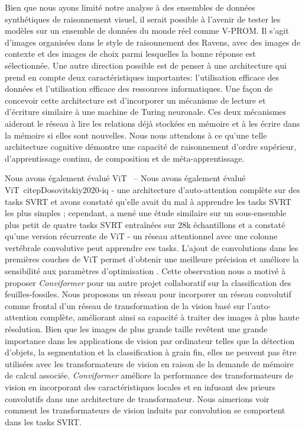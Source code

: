 Bien que nous ayons limit\'e notre analyse \`a des ensembles de donn\'ees synth\'etiques de raisonnement visuel, il serait possible \`a l'avenir de tester les mod\`eles sur un ensemble de donn\'ees du monde r\'eel comme V-PROM. Il s'agit d'images organis\'ees dans le style de raisonnement des Ravens, avec des images de contexte et des images de choix parmi lesquelles la bonne r\'eponse est s\'electionn\'ee. Une autre direction possible est de penser \`a une architecture qui prend en compte deux caract\'eristiques importantes: l'utilisation efficace des donn\'ees et l'utilisation efficace des ressources informatiques. Une façon de concevoir cette architecture est d'incorporer un m\'ecanisme de lecture et d'\'ecriture similaire \`a une machine de Turing neuronale. Ces deux m\'ecanismes aideront le r\'eseau \`a lire les relations d\'ej\`a stock\'ees en m\'emoire et \`a les \'ecrire dans la m\'emoire si elles sont nouvelles. Nous nous attendons \`a ce qu'une telle architecture cognitive d\'emontre une capacit\'e de raisonnement d'ordre sup\'erieur, d'apprentissage continu, de composition et de m\'eta-apprentissage.

Nous avons \'egalement \'evalu\'e ViT~\citep{Dosovitskiy2020-iq} -- Nous avons \'egalement \'evalu\'e ViT~citep{Dosovitskiy2020-iq} - une architecture d'auto-attention compl\`ete sur des tasks SVRT et avons constat\'e qu'elle avait du mal \`a apprendre les tasks SVRT les plus simples ; cependant, \citet{messina2021recurrent} a men\'e une \'etude similaire sur un sous-ensemble plus petit de quatre tasks SVRT entra\^in\'ees sur 28k \'echantillons et a constat\'e qu'une version r\'ecurrente de ViT - un r\'eseau attentionnel avec une colonne vert\'ebrale convolutive peut apprendre ces tasks. L'ajout de convolutions dans les premi\`eres couches de ViT permet d'obtenir une meilleure pr\'ecision et am\'eliore la sensibilit\'e aux param\`etres d'optimisation \citep{xiao2021early}. Cette observation nous a motiv\'e \`a proposer \textit{Conviformer} \citep{vaishnav2022conviformers} pour un autre projet collaboratif sur la classification des feuilles-fossiles. Nous proposons un r\'eseau pour incorporer un r\'eseau convolutif comme frontal d'un r\'eseau de transformation de la vision bas\'e sur l'auto-attention compl\`ete, am\'eliorant ainsi sa capacit\'e \`a traiter des images \`a plus haute r\'esolution. Bien que les images de plus grande taille rev\^etent une grande importance dans les applications de vision par ordinateur telles que la d\'etection d'objets, la segmentation et la classification \`a grain fin, elles ne peuvent pas \^etre utilis\'ees avec les transformateurs de vision en raison de la demande de m\'emoire de calcul associ\'ee. \textit{Conviformer} am\'eliore la performance des transformateurs de vision en incorporant des caract\'eristiques locales et en infusant des prieurs convolutifs dans une architecture de transformateur. Nous aimerions voir comment les transformateurs de vision induits par convolution se comportent dans les tasks SVRT. 

